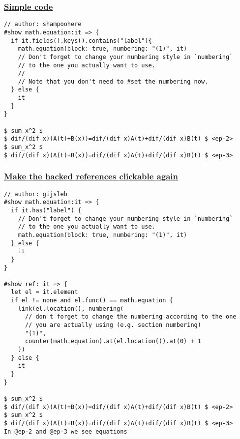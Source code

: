 \subsubsection{\texorpdfstring{\hyperref[simple-code]{Simple
code}}{Simple code}}\label{simple-code}

\begin{verbatim}
// author: shampoohere
#show math.equation:it => {
  if it.fields().keys().contains("label"){
    math.equation(block: true, numbering: "(1)", it)
    // Don't forget to change your numbering style in `numbering`
    // to the one you actually want to use.
    //
    // Note that you don't need to #set the numbering now.
  } else {
    it
  }
}

$ sum_x^2 $
$ dif/(dif x)(A(t)+B(x))=dif/(dif x)A(t)+dif/(dif x)B(t) $ <ep-2>
$ sum_x^2 $
$ dif/(dif x)(A(t)+B(x))=dif/(dif x)A(t)+dif/(dif x)B(t) $ <ep-3>
\end{verbatim}

\pandocbounded{}

\subsubsection{\texorpdfstring{\hyperref[make-the-hacked-references-clickable-again]{Make
the hacked references clickable
again}}{Make the hacked references clickable again}}\label{make-the-hacked-references-clickable-again}

\begin{verbatim}
// author: gijsleb
#show math.equation:it => {
  if it.has("label") {
    // Don't forget to change your numbering style in `numbering`
    // to the one you actually want to use.
    math.equation(block: true, numbering: "(1)", it)
  } else {
    it
  }
}

#show ref: it => {
  let el = it.element
  if el != none and el.func() == math.equation {
    link(el.location(), numbering(
      // don't forget to change the numbering according to the one
      // you are actually using (e.g. section numbering)
      "(1)",
      counter(math.equation).at(el.location()).at(0) + 1
    ))
  } else {
    it
  }
}

$ sum_x^2 $
$ dif/(dif x)(A(t)+B(x))=dif/(dif x)A(t)+dif/(dif x)B(t) $ <ep-2>
$ sum_x^2 $
$ dif/(dif x)(A(t)+B(x))=dif/(dif x)A(t)+dif/(dif x)B(t) $ <ep-3>
In @ep-2 and @ep-3 we see equations
\end{verbatim}

